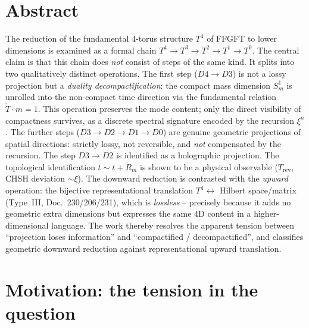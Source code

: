 
\section*{Abstract}

The reduction of the fundamental 4-torus structure $T^4$ of FFGFT to lower
dimensions is examined as a formal chain $T^4 \to T^3 \to T^2 \to T^1 \to T^0$.
The central claim is that this chain does \emph{not} consist of steps of the
same kind. It splits into two qualitatively distinct operations. The first step
($D4\!\to\!D3$) is not a lossy projection but a \emph{duality decompactification}:
the compact mass dimension $S^1_m$ is unrolled into the non-compact time
direction via the fundamental relation $\tilde{T}\cdot m = 1$. This operation
preserves the mode content; only the direct visibility of compactness survives,
as a discrete spectral signature encoded by the recursion $\xi^n$. The further
steps ($D3\!\to\!D2\!\to\!D1\!\to\!D0$) are genuine geometric projections of
spatial directions: strictly lossy, not reversible, and \emph{not} compensated
by the recursion. The step $D3\!\to\!D2$ is identified as a holographic
projection. The topological identification $t\sim t+R_m$ is shown to be a
physical observable ($T_\text{rev}$, CHSH deviation $\sim\xi$). The downward reduction is contrasted with the
\emph{upward} operation: the bijective representational translation
$T^4 \leftrightarrow$ Hilbert space/matrix (Type~III, Doc.~230/206/231), which is
\emph{lossless} -- precisely because it adds no geometric extra dimensions but
expresses the same 4D content in a higher-dimensional language. The work thereby
resolves the apparent tension between ``projection loses information'' and
``compactified / decompactified'', and classifies geometric downward reduction
against representational upward translation.

\section{Motivation: the tension in the question}

